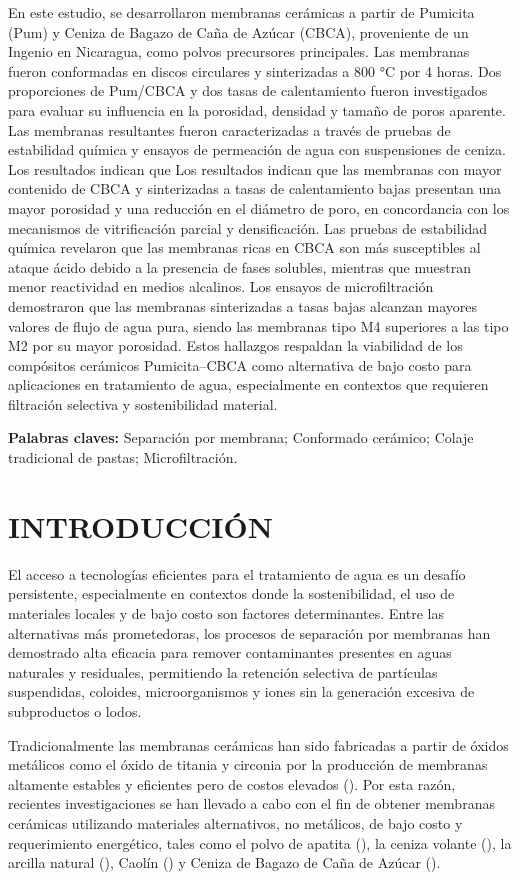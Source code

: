 \documentclass{article}
\begin{document}
\justifying
En este estudio, se desarrollaron membranas cerámicas a partir de Pumicita (Pum) y Ceniza de Bagazo de Caña de Azúcar (CBCA), proveniente de un Ingenio en Nicaragua, como polvos precursores principales. Las membranas fueron conformadas en discos circulares y sinterizadas a 800 °C por 4 horas. Dos proporciones de Pum/CBCA y dos tasas de calentamiento fueron investigados para evaluar su influencia en la porosidad, densidad y tamaño de poros aparente. Las membranas resultantes fueron caracterizadas a través de pruebas de estabilidad química y ensayos de permeación de agua con suspensiones de ceniza. Los resultados indican que Los resultados indican que las membranas con mayor contenido de CBCA y sinterizadas a tasas de calentamiento bajas presentan una mayor porosidad y una reducción en el diámetro de poro, en concordancia con los mecanismos de vitrificación parcial y densificación. Las pruebas de estabilidad química revelaron que las membranas ricas en CBCA son más susceptibles al ataque ácido debido a la presencia de fases solubles, mientras que muestran menor reactividad en medios alcalinos. Los ensayos de microfiltración demostraron que las membranas sinterizadas a tasas bajas alcanzan mayores valores de flujo de agua pura, siendo las membranas tipo M4 superiores a las tipo M2 por su mayor porosidad. Estos hallazgos respaldan la viabilidad de los compósitos cerámicos Pumicita–CBCA como alternativa de bajo costo para aplicaciones en tratamiento de agua, especialmente en contextos que requieren filtración selectiva y sostenibilidad material.

\textbf{Palabras claves:} Separación por membrana; Conformado cerámico; Colaje tradicional de pastas; Microfiltración. 

\newpage
\section{INTRODUCCIÓN}

El acceso a tecnologías eficientes para el tratamiento de agua es un desafío persistente, especialmente en contextos donde la sostenibilidad, el uso de materiales locales y de bajo costo son factores determinantes. Entre las alternativas más prometedoras, los procesos de separación por membranas han demostrado alta eficacia para remover contaminantes presentes en aguas naturales y residuales, permitiendo la retención selectiva de partículas suspendidas, coloides, microorganismos y iones sin la generación excesiva de subproductos o lodos.

Tradicionalmente las membranas cerámicas han sido fabricadas a partir de óxidos metálicos como el óxido de titania y circonia por la producción de membranas altamente estables y eficientes pero de costos elevados (\cite{Gitis2016,Nandi2008}). Por esta razón, recientes investigaciones se han llevado a cabo con el fin de obtener membranas cerámicas utilizando materiales alternativos, no metálicos, de bajo costo y requerimiento energético, tales como el polvo de apatita (\cite{Masmoudi2007}),  la ceniza volante (\cite{Saffaj2004}), la arcilla natural (\cite{Saffaj2005}), Caolín (\cite{Rawat2018}) y Ceniza de Bagazo de Caña de Azúcar (\cite{Andrade2019}). 
\end{document}
